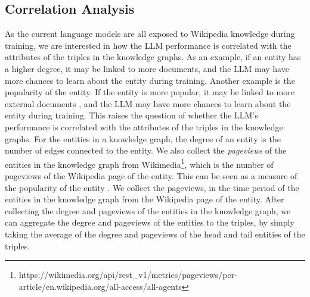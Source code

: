 
\subsection{Correlation Analysis}
\label{app:correlation_analysis}
As the current language models are all exposed to Wikipedia knowledge during training, we are interested in how the LLM performance is correlated with the attributes of the triples in the knowledge graphs. As an example, if an entity has a higher degree, it may be linked to more documents, and the LLM may have more chances to learn about the entity during training. Another example is the popularity of the entity. If the entity is more popular, it may be linked to more external documents , and the LLM may have more chances to learn about the entity during training. This raises the question of whether the LLM's performance is correlated with the attributes of the triples in the knowledge graphs.
For the entities in a knowledge graph, the degree of an entity is the number of edges connected to the entity. We also collect the \textit{pageviews} of the entities in the knowledge graph from Wikimedia\footnote{https://wikimedia.org/api/rest\_v1/metrics/pageviews/per-article/en.wikipedia.org/all-access/all-agents}{}, which is the number of pageviews of the Wikipedia page of the entity. This can be seen as a measure of the popularity of the entity  . We collect the pageviews, in the time period of the entities in the knowledge graph from the Wikipedia page of the entity.
After collecting the degree and pageviews of the entities in the knowledge graph, we can aggregate the degree and pageviews of the entities to the triples, by simply taking the average of the degree and pageviews of the head and tail entities of the triples.

